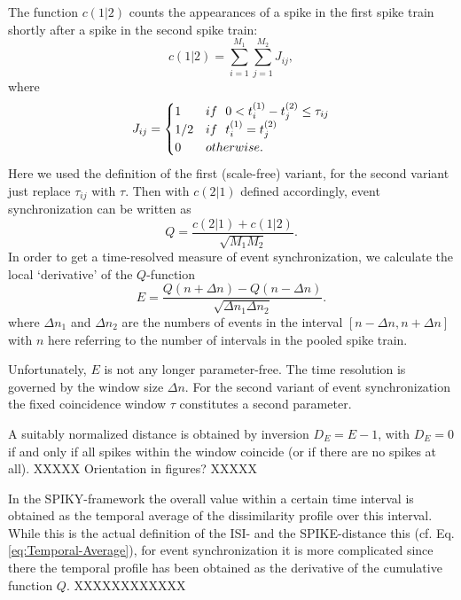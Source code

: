 \documentclass[10pt,twocolumn]{elsart5p}
\begin{document}
The function $c(1|2)$ counts the appearances of a spike in the first spike train shortly after a spike in the second spike train:
%
\begin{equation} \label{eq:Event-Count}
    c (1|2) = \sum_{i=1}^{M_1} \sum_{j=1}^{M_2} J_{ij},
\end{equation}
%
where
%
\begin{equation} \label{eq:Event-Synchronicity}
    J_{ij} = \begin{cases}
                      1     & {\rm if} ~~ 0 < t_i^{(1)} - t_j^{(2)} \leq \tau_{ij} \cr
                      1/2   & {\rm if} ~~ t^{(1)}_i = t^{(2)}_j \cr
                      0     & {\rm otherwise}.
                  \end{cases}
\end{equation}
%
Here we used the definition of the first (scale-free) variant, for the second variant just replace $\tau_{ij}$ with $\tau$. Then with $c(2|1)$ defined accordingly, event synchronization can be written as
%
\begin{equation} \label{eq:Event-Synchro}
    Q = \frac {c (2|1) + c (1|2)} {\sqrt{M_1 M_2}}.
\end{equation}
%
In order to get a time-resolved measure of event synchronization, we calculate the local `derivative' of the $Q$-function
%
\begin{equation} \label{eq:Window-Event-Synchro}
    E = \frac {Q (n+\Delta n) - Q (n-\Delta n)} {\sqrt{\Delta n_1 \Delta n_2}}.
\end{equation}
%
where $\Delta n_1$ and $\Delta n_2$ are the numbers of events in the interval $[n-\Delta n, n+\Delta n]$ with $n$ here referring to the number of intervals in the pooled spike train.

Unfortunately, $E$ is not any longer parameter-free. The time resolution is governed by the window size $\Delta n$. For the second variant of event synchronization the fixed coincidence window $\tau$ constitutes a second parameter.

A suitably normalized distance is obtained by inversion $D_E=E-1$, with $D_E = 0$ if and only if all spikes within the window coincide (or if there are no spikes at all). XXXXX Orientation in figures? XXXXX

In the SPIKY-framework the overall value within a certain time interval is obtained as the temporal average of the dissimilarity profile over this interval. While this is the actual definition of the ISI- and the SPIKE-distance this (cf. Eq. \ref{eq:Temporal-Average}), for event synchronization it is more complicated since there the temporal profile has been obtained as the derivative of the cumulative function $Q$. XXXXXXXXXXXX
\end{document}
